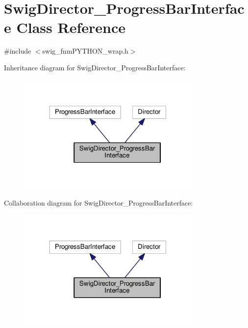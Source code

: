 \hypertarget{classSwigDirector__ProgressBarInterface}{\section{Swig\+Director\+\_\+\+Progress\+Bar\+Interface Class Reference}
\label{classSwigDirector__ProgressBarInterface}
}


{\ttfamily \#include $<$swig\+\_\+fnm\+P\+Y\+T\+H\+O\+N\+\_\+wrap.\+h$>$}



Inheritance diagram for Swig\+Director\+\_\+\+Progress\+Bar\+Interface\+:
\nopagebreak
\begin{figure}[H]
\begin{center}
\leavevmode
\includegraphics[width=258pt]{classSwigDirector__ProgressBarInterface__inherit__graph}
\end{center}
\end{figure}


Collaboration diagram for Swig\+Director\+\_\+\+Progress\+Bar\+Interface\+:
\nopagebreak
\begin{figure}[H]
\begin{center}
\leavevmode
\includegraphics[width=258pt]{classSwigDirector__ProgressBarInterface__coll__graph}
\end{center}
\end{figure}
